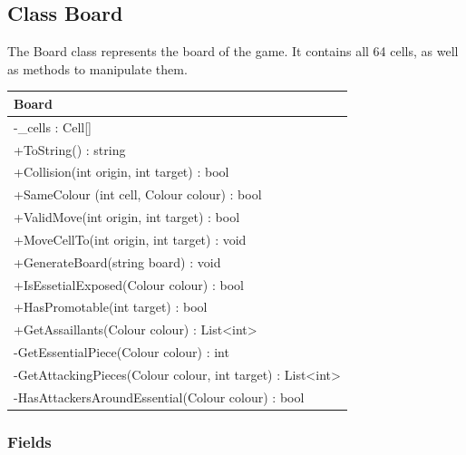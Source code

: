 \documentclass[12pt]{article}
\begin{document}
\newpage


\subsection{Class Board}

The Board class represents the board of the game.
It contains all 64 cells, as well as methods to manipulate them.

\begin{table}[H]
    \begin{tabular}{|l|}
    \hline
    \rowcolor[HTML]{C0C0C0} 
    \textbf{Board}                                             \\ \hline
    \rowcolor[HTML]{EFEFEF}                                    
    -\_cells : Cell[]                                          \\ \hline
    +ToString() : string                                       \\ \hline
    +Collision(int origin, int target) : bool                  \\ \hline
    +SameColour (int cell, Colour colour) : bool               \\ \hline
    +ValidMove(int origin, int target) : bool                  \\ \hline
    +MoveCellTo(int origin, int target) : void                 \\ \hline
    +GenerateBoard(string board) : void                        \\ \hline
    +IsEssetialExposed(Colour colour) : bool                   \\ \hline
    +HasPromotable(int target) : bool                          \\ \hline
    +GetAssaillants(Colour colour) : List<int>                 \\ \hline
    -GetEssentialPiece(Colour colour) : int                    \\ \hline
    -GetAttackingPieces(Colour colour, int target) : List<int> \\ \hline
    -HasAttackersAroundEssential(Colour colour) : bool          \\ \hline
    \end{tabular}
\end{table}

\subsubsection{Fields}
\end{document}

